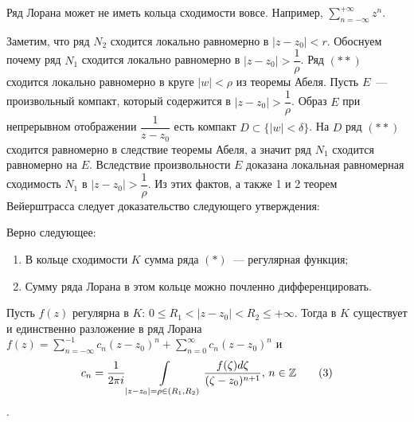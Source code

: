 \begin{example}
    Ряд Лорана может не иметь кольца сходимости вовсе. Например, \(\sum\limits_{n = -\infty}^
    {+\infty} z^n\).
\end{example}

Заметим, что ряд \(N_2\) сходится локально равномерно в \(|z-z_0| < r\). Обоснуем почему ряд
\(N_1\) сходится локально равномерно в \(|z-z_0| > \dfrac{1}{\rho}\). Ряд \((**)\) сходится локально
равномерно в круге \(|w| < \rho\) из теоремы Абеля. Пусть \(E\)~--- произвольный компакт, который 
содержится в \(|z-z_0| > \dfrac{1}{\rho}\). Образ \(E\) при непрерывном отображении \(\dfrac{1}
{z-z_0}\) есть компакт \(D \subset \{|w|<\delta\}\). На \(D\) ряд \((**)\) сходится равномерно
в следствие теоремы Абеля, а значит ряд \(N_1\) сходится равномерно на \(E\). Вследствие 
произвольности \(E\) доказана локальная равномерная сходимость \(N_1\) в \(|z-z_0| > \dfrac{1}
{\rho}\). Из этих фактов, а также 1 и 2 теорем Вейерштрасса следует доказательство следующего
утверждения:

\begin{statement}
    Верно следующее:
    \begin{enumerate}[wide=20pt, label=\arabic*., itemsep=0ex]
        \item В кольце сходимости \(K\) сумма ряда \((*)\)~--- регулярная функция;
        \item Сумму ряда Лорана в этом кольце можно почленно дифференцировать.
    \end{enumerate}
\end{statement}

\begin{statement}
    Пусть \(f(z)\) регулярна в \(K\colon \, 0 \le R_1 < |z-z_0|< R_2 \le +\infty\). Тогда в \(K\)
    существует и единственно разложение в ряд Лорана \(f(z) = \sum\limits_{n = -\infty}^{-1} c_n 
    (z-z_0)^n + \sum\limits_{n=0}^{\infty} c_n (z-z_0)^n\) и \[c_n = \dfrac{1}{2 \pi i} 
    \int\limits_{|z - z_0| = \rho \in (R_1, R_2)} \dfrac{f(\zeta) d\zeta}{(\zeta - z_0) ^ {n+1}}, \,
    n \in \mathbb{Z} \tag{3}\].
\end{statement}

